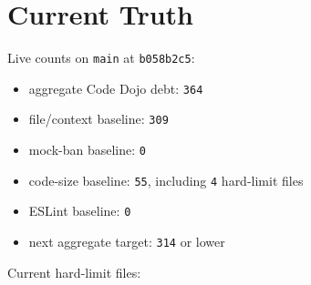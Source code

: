 \section{Current Truth}\label{record-253-current-truth}

Live counts on \texttt{m\allowbreak{}a\allowbreak{}i\allowbreak{}n} at \texttt{b\allowbreak{}0\allowbreak{}5\allowbreak{}8\allowbreak{}b\allowbreak{}2\allowbreak{}c\allowbreak{}5}:

\begin{itemize}
\tightlist
\item
  aggregate Code Dojo debt: \texttt{3\allowbreak{}6\allowbreak{}4}
\item
  file/context baseline: \texttt{3\allowbreak{}0\allowbreak{}9}
\item
  mock-ban baseline: \texttt{0}
\item
  code-size baseline: \texttt{5\allowbreak{}5}, including \texttt{4} hard-limit files
\item
  ESLint baseline: \texttt{0}
\item
  next aggregate target: \texttt{3\allowbreak{}1\allowbreak{}4} or lower
\end{itemize}

Current hard-limit files:

